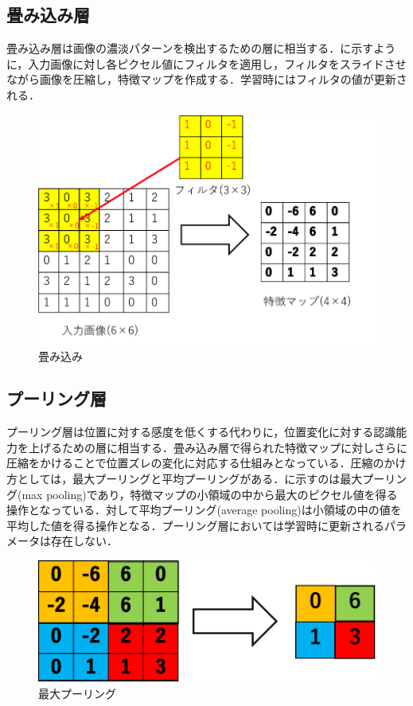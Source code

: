 \newpage
\subsection{畳み込み層}
畳み込み層は画像の濃淡パターンを検出するための層に相当する．に示すように，入力画像に対し各ピクセル値にフィルタを適用し，フィルタをスライドさせながら画像を圧縮し，特徴マップを作成する．学習時にはフィルタの値が更新される．
\begin{figure}[htbp]
	\begin{center}
		\includegraphics[scale=0.83]{./images/deeplearning/convolution.png}
		\caption{畳み込み}
		\label{fig:convolution}
	\end{center}
\end{figure}
\vspace{-40pt}
\subsection{プーリング層}
プーリング層は位置に対する感度を低くする代わりに，位置変化に対する認識能力を上げるための層に相当する．畳み込み層で得られた特徴マップに対しさらに圧縮をかけることで位置ズレの変化に対応する仕組みとなっている．圧縮のかけ方としては，最大プーリングと平均プーリングがある．に示すのは最大プーリング(max pooling)であり，特徴マップの小領域の中から最大のピクセル値を得る操作となっている．対して平均プーリング(average pooling)は小領域の中の値を平均した値を得る操作となる．プーリング層においては学習時に更新されるパラメータは存在しない．

\begin{figure}[htbp]
	\begin{center}
		\includegraphics[scale=0.293]{./images/deeplearning/pooling.png}
		\caption{最大プーリング}
		\label{fig:pooling}
	\end{center}
\end{figure}

